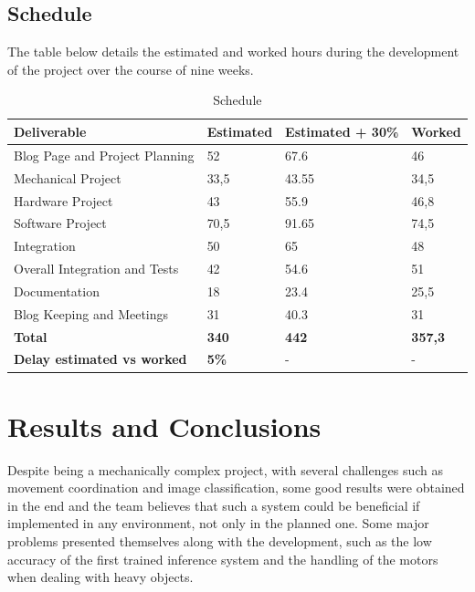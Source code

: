 \documentclass[a4paper,11pt]{article}
\begin{document}
\subsection{Schedule}
The table below details the estimated and worked hours during the development of the project over the course of nine weeks.

\begin{table}[H]
  \small
  \caption{\small{Schedule}}
  \begin{center}
    \begin{tabular}{|l|l|l|l|}
      \hline
      \textbf{Deliverable}               & \textbf{Estimated} & \textbf{Estimated + 30\%} & \textbf{Worked} \\ \hline
      Blog Page and Project Planning     & 52                 & 67.6                      & 46              \\ \hline
      Mechanical Project                 & 33,5               & 43.55                     & 34,5            \\ \hline
      Hardware Project                   & 43                 & 55.9                      & 46,8            \\ \hline
      Software Project                   & 70,5               & 91.65                     & 74,5            \\ \hline
      Integration                        & 50                 & 65                        & 48              \\ \hline
      Overall Integration and Tests      & 42                 & 54.6                      & 51              \\ \hline
      Documentation                      & 18                 & 23.4                      & 25,5            \\ \hline
      Blog Keeping and Meetings          & 31                 & 40.3                      & 31              \\ \hline
      \textbf{Total}                     & \textbf{340}       & \textbf{442}              & \textbf{357,3}  \\ \hline
      \textbf{Delay estimated vs worked} & \textbf{5\%}       & -                         & -               \\ \hline
    \end{tabular}
  \end{center}
  \label{tab:schedule}
\end{table}

\section{Results and Conclusions}
Despite being a mechanically complex project, with several challenges such as movement coordination and image classification, some good results were obtained in the end and the team believes that such a system could be beneficial if implemented in any environment, not only in the planned one. Some major problems presented themselves along with the development, such as the low accuracy of the first trained inference system and the handling of the motors when dealing with heavy objects.
\end{document}
